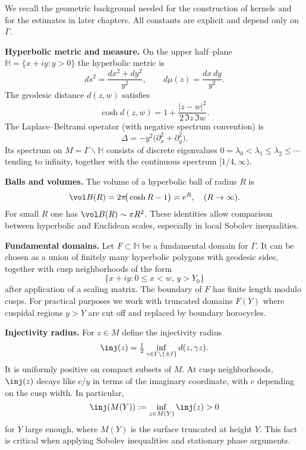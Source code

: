 
We recall the geometric background needed for the construction of kernels and
for the estimates in later chapters.
All constants are explicit and depend only on $\Gamma$.

\medskip
\noindent\textbf{Hyperbolic metric and measure.}
On the upper half–plane $\mathbb{H}=\{x+iy : y>0\}$ the hyperbolic metric is
\[
  ds^{2} = \frac{dx^{2}+dy^{2}}{y^{2}},
  \qquad
  d\mu(z) = \frac{dx\,dy}{y^{2}}.
\]
The geodesic distance $d(z,w)$ satisfies
\[
  \cosh d(z,w) = 1 + \frac{|z-w|^{2}}{2\,\Im z\,\Im w}.
\]
The Laplace–Beltrami operator (with negative spectrum convention) is
\[
  \Delta = -y^{2}\Big(\partial_{x}^{2} + \partial_{y}^{2}\Big).
\]
Its spectrum on $M=\Gamma\backslash\mathbb{H}$ consists of discrete eigenvalues
$0=\lambda_{0}<\lambda_{1}\le\lambda_{2}\le\cdots$ tending to infinity,
together with the continuous spectrum $[1/4,\infty)$.

\medskip
\noindent\textbf{Balls and volumes.}
The volume of a hyperbolic ball of radius $R$ is
\[
  \vol B(R) = 2\pi\!\big(\cosh R - 1\big) \asymp e^{R}, \quad (R\to\infty).
\]
For small $R$ one has $\vol B(R)\sim \pi R^{2}$.
These identities allow comparison between hyperbolic and Euclidean scales,
especially in local Sobolev inequalities.

\medskip
\noindent\textbf{Fundamental domains.}
Let $F\subset\mathbb{H}$ be a fundamental domain for $\Gamma$.
It can be chosen as a union of finitely many hyperbolic polygons with geodesic sides,
together with cusp neighborhoods of the form
\[
  \{ x+iy : 0\le x<w,\, y>Y_{0}\}
\]
after application of a scaling matrix.
The boundary of $F$ has finite length modulo cusps.
For practical purposes we work with truncated domains $F(Y)$ where cuspidal regions $y>Y$
are cut off and replaced by boundary horocycles.

\medskip
\noindent\textbf{Injectivity radius.}
For $z\in M$ define the injectivity radius
\[
  \inj(z) = \tfrac12 \inf_{\gamma\in\Gamma\setminus\{\pm I\}} d(z,\gamma z).
\]
It is uniformly positive on compact subsets of $M$.
At cusp neighborhoods, $\inj(z)$ decays like $c/y$ in terms of the imaginary coordinate,
with $c$ depending on the cusp width.
In particular,
\[
  \inj(M(Y)) := \inf_{z\in M(Y)}\inj(z) > 0
\]
for $Y$ large enough, where $M(Y)$ is the surface truncated at height $Y$.
This fact is critical when applying Sobolev inequalities and stationary phase arguments.

